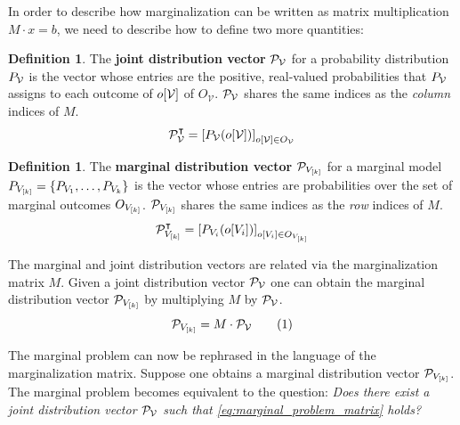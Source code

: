 \documentclass[aps, 10pt, english, twoside, pra, nofootinbib, longbibliography]{revtex4-1}
\theoremstyle{plain}
\theoremstyle{definition}
\newtheorem{definition}[theorem]{Definition}
\theoremstyle{remark}
\newcommand{\term}[1]{\textcolor{Mahogany}{\textbf{#1}}}
\newcommand{\outc}[1]{o\!\bs{#1}} %
\begin{document}
    In order to describe how marginalization can be written as matrix multiplication $M \cdot x = b$, we need to describe how to define two more quantities:

    \begin{definition}
        The \term{joint distribution vector} $\probvec[\mathcal{V}]$ for a probability distribution $\prob[\mathcal{V}]$ is the vector whose entries are the positive, real-valued probabilities that $\prob[\mathcal{V}]$ assigns to each outcome of $\outc{\mathcal{V}}$ of $O_\mathcal{V}$. $\probvec[\mathcal{V}]$ shares the same indices as the \textit{column} indices of $M$.
        \[ \probvec[\mathcal{V}]^\intercal = \bs{\prob[\mathcal{V}][\outc{\mathcal{V}}]}_{o\bs{\mathcal{V}} \in O_{\mathcal{V}}} \]
    \end{definition}
    \begin{definition}
        The \term{marginal distribution vector} $\probvec[V_{\bs{k}}]$ for a marginal model $\prob[V_{\bs{k}}] = \bc{P_{V_1}, \ldots, P_{V_k}}$ is the vector whose entries are probabilities over the set of marginal outcomes $O_{V_{\left[ k \right]}}$. $\probvec[V_{\bs{k}}]$ shares the same indices as the \textit{row} indices of $M$.
        \[ \probvec[V_{\bs{k}}]^\intercal = \bs{\prob[V_i][\outc{V_i}] }_{o\bs{V_i} \in O_{V_{\bs{k}}}} \]
    \end{definition}
    The marginal and joint distribution vectors are related via the marginalization matrix $M$. Given a joint distribution vector $\probvec[\mathcal{V}]$ one can obtain the marginal distribution vector $\probvec[V_{\bs{k}}]$ by multiplying $M$ by $\probvec[\mathcal{V}]$.
    \[ \probvec[V_{\bs{k}}] = M \cdot \probvec[\mathcal{V}] \eq \label{eq:marginal_problem_matrix} \]

    The marginal problem can now be rephrased in the language of the marginalization matrix. Suppose one obtains a marginal distribution vector $\probvec[V_{\bs{k}}]$. The marginal problem becomes equivalent to the question: \textit{Does there exist a joint distribution vector $\probvec[\mathcal{V}]$ such that \cref{eq:marginal_problem_matrix} holds?}
\end{document}
